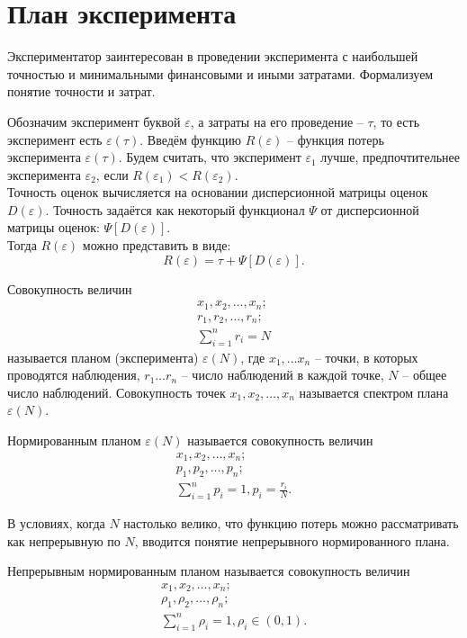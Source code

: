 \section{План эксперимента}

Экспериментатор заинтересован в проведении эксперимента с наибольшей точностью и минимальными финансовыми и иными затратами. Формализуем понятие точности и затрат.

Обозначим эксперимент буквой $\varepsilon$, а затраты на его проведение -- $\tau$, то есть эксперимент есть $\varepsilon(\tau)$. Введём функцию $R(\varepsilon)$ -- функция потерь эксперимента $\varepsilon(\tau)$. Будем считать, что эксперимент $\varepsilon_1$ лучше, предпочтительнее эксперимента $\varepsilon_2$, если $R(\varepsilon_1) < R(\varepsilon_2)$.\\
Точность оценок вычисляется на основании дисперсионной матрицы оценок $D(\varepsilon)$. Точность задаётся как некоторый функционал $\Psi$ от дисперсионной матрицы оценок: $\Psi[D(\varepsilon)]$.\\
Тогда $R(\varepsilon)$ можно представить в виде:
$$R(\varepsilon) = \tau + \Psi[D(\varepsilon)].$$

\begin{definition}
	Совокупность величин
	\begin{gather}
	x_1, x_2, \dots, x_n;\\
	r_1, r_2, \dots, r_n;\\
	\sum_{i=1}^n r_i = N
	\end{gather}
	называется планом (эксперимента) $\varepsilon(N)$, где $x_1, \dots x_n$ -- точки, в которых проводятся наблюдения, $r_1 \dots r_n$ -- число наблюдений в каждой точке, $N$ -- общее число наблюдений. Совокупность точек  $x_1, x_2, \dots, x_n$ называется спектром плана $\varepsilon(N)$.
\end{definition}

\begin{definition}
	Нормированным планом $\varepsilon(N)$ называется совокупность величин
	\begin{gather}
	x_1, x_2, \dots, x_n;\\
	p_1, p_2, \dots, p_n;\\
	\sum_{i = 1}^n p_i = 1, p_i = \frac {r_i} {N}.
	\end{gather}
\end{definition}

В условиях, когда  $N$ настолько велико, что функцию потерь можно рассматривать как непрерывную по $N$, вводится понятие непрерывного нормированного плана.
\begin{definition}
	Непрерывным нормированным планом называется совокупность величин
	\begin{gather}
	x_1, x_2, \dots, x_n;\\
	\rho_1, \rho_2, \dots, \rho_n;\\
	\sum_{i = 1}^n \rho_i = 1, \rho_i \in (0, 1).
	\end{gather}
\end{definition}

